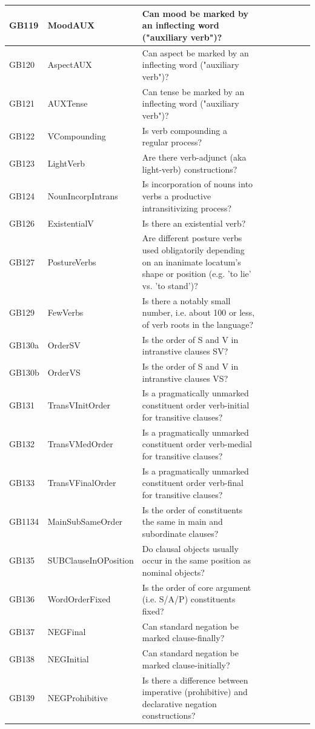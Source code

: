 \documentclass[draft,10pt]{article} %
\begin{document}
\begin{landscape}
\begin{longtable}{| l | p{4cm}| p{12cm}|p{2cm}|p{2cm}|p{2cm}|p{2cm}|p{2cm}|p{2cm}|}
GB119 & MoodAUX&Can mood be marked by an inflecting word ("auxiliary verb")?\\ \hline
GB120 & AspectAUX&Can aspect be marked by an inflecting word ("auxiliary verb")?\\ \hline
GB121 & AUXTense&Can tense be marked by an inflecting word ("auxiliary verb")?\\ \hline
GB122 & VCompounding&Is verb compounding a regular process?\\ \hline
GB123 & LightVerb&Are there verb-adjunct (aka light-verb) constructions?\\ \hline
GB124 & NounIncorpIntrans&Is incorporation of nouns into verbs a productive intransitivizing process?\\ \hline
GB126 & ExistentialV&Is there an existential verb?\\ \hline
GB127 & PostureVerbs&Are different posture verbs used obligatorily depending on an inanimate locatum's shape or position (e.g. 'to lie' vs. 'to stand')?\\ \hline
GB129 & FewVerbs&Is there a notably small number, i.e. about 100 or less, of verb roots in the language?\\ \hline
GB130a & OrderSV&Is the order of S and V in intranstive clauses SV?\\ \hline
GB130b & OrderVS&Is the order of S and V in intranstive clauses VS?\\ \hline
GB131 & TransVInitOrder&Is a pragmatically unmarked constituent order verb-initial for transitive clauses?\\ \hline
GB132 & TransVMedOrder&Is a pragmatically unmarked constituent order verb-medial for transitive clauses?\\ \hline
GB133 & TransVFinalOrder&Is a pragmatically unmarked constituent order verb-final for transitive clauses?\\ \hline
GB1134 & MainSubSameOrder&Is the order of constituents the same in main and subordinate clauses?\\ \hline
GB135 & SUBClauseInOPosition&Do clausal objects usually occur in the same position as nominal objects?\\ \hline
GB136 & WordOrderFixed&Is the order of core argument (i.e. S/A/P) constituents fixed?\\ \hline
GB137 & NEGFinal&Can standard negation be marked clause-finally?\\ \hline
GB138 & NEGInitial&Can standard negation be marked clause-initially?\\ \hline
GB139 & NEGProhibitive&Is there a difference between imperative (prohibitive) and declarative negation constructions?\\ \hline

\end{longtable}
\end{landscape}
\end{document}
